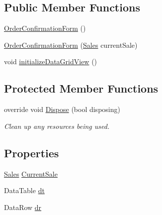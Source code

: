 \subsection*{Public Member Functions}
\begin{DoxyCompactItemize}
\item 
\hyperlink{class_health___assignment_1_1_order_confirmation_form_af9a94b24b61f3a8dc6b770c86c575df8}{Order\+Confirmation\+Form} ()
\item 
\hyperlink{class_health___assignment_1_1_order_confirmation_form_afd2dce9f1e316b953d068b5d84047b57}{Order\+Confirmation\+Form} (\hyperlink{class_health___assignment_1_1_sales}{Sales} current\+Sale)
\item 
void \hyperlink{class_health___assignment_1_1_order_confirmation_form_ab77c840f7f2351ad1f18ba7bbb614911}{initialize\+Data\+Grid\+View} ()
\end{DoxyCompactItemize}
\subsection*{Protected Member Functions}
\begin{DoxyCompactItemize}
\item 
override void \hyperlink{class_health___assignment_1_1_order_confirmation_form_ab11264cdb39a2218d2374b0a1468edf5}{Dispose} (bool disposing)
\begin{DoxyCompactList}\small\item\em Clean up any resources being used. \end{DoxyCompactList}\end{DoxyCompactItemize}
\subsection*{Properties}
\begin{DoxyCompactItemize}
\item 
\hyperlink{class_health___assignment_1_1_sales}{Sales} \hyperlink{class_health___assignment_1_1_order_confirmation_form_a934aaac546f4c03ea9dc6888af6d6d42}{Current\+Sale}
\item 
Data\+Table \hyperlink{class_health___assignment_1_1_order_confirmation_form_ac2856de1cbda7626963fce331a6d9557}{dt}
\item 
Data\+Row \hyperlink{class_health___assignment_1_1_order_confirmation_form_ace4f0cf22a9872e85bd96699da384498}{dr}
\end{DoxyCompactItemize}


